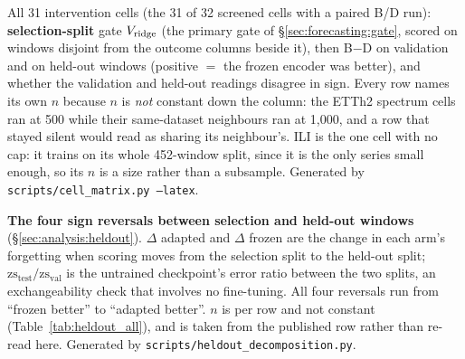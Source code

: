 \begin{table}[!htbp]
\centering
\caption{All 31 intervention cells (the 31 of 32 screened cells with a paired
B/D run): \textbf{selection-split} gate $\Vb{\text{ridge}}$ (the primary gate of
\S\ref{sec:forecasting:gate}, scored on windows disjoint from the outcome columns
beside it), then
B$-$D on validation and on held-out windows (positive ${=}$ the frozen
encoder was better), and whether the validation and held-out readings
disagree in sign. Every row names its own $n$ because $n$ is \emph{not}
constant down the column: the ETTh2 spectrum cells ran at 500 while their
same-dataset neighbours ran at 1{,}000, and a row that stayed silent would read
as sharing its neighbour's. ILI is the one cell with no cap: it trains on its
whole 452-window split, since it is the only series small enough, so its
$n$ is a size rather than a subsample. Generated by
\texttt{scripts/cell\_matrix.py --latex}.}
\label{tab:heldout_all}

\end{table}


\begin{table}[!htbp]
\centering
\caption{\textbf{The four sign reversals between selection and held-out
windows} (\S\ref{sec:analysis:heldout}). $\Delta$ adapted and $\Delta$ frozen
are the change in each arm's forgetting when scoring moves from the selection
split to the held-out split; $\text{zs}_\text{test}/\text{zs}_\text{val}$ is
the untrained checkpoint's error ratio between the two splits, an
exchangeability check that involves no fine-tuning. All four reversals run from
``frozen better'' to ``adapted better''. $n$ is per row and not constant
(Table~\ref{tab:heldout_all}), and is taken from the published row rather than
re-read here. Generated by \texttt{scripts/heldout\_decomposition.py}.}
\label{tab:heldout_decomp}

\end{table}

